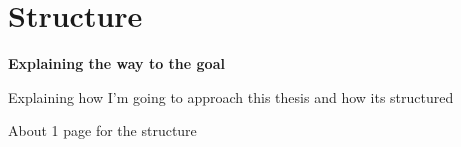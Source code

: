 
\chapter{Structure}

\label{ch:structure}

\textbf{Explaining the way to the goal}

Explaining how I'm going to approach this thesis and how its structured

About 1 page for the structure

\pagebreak[1]